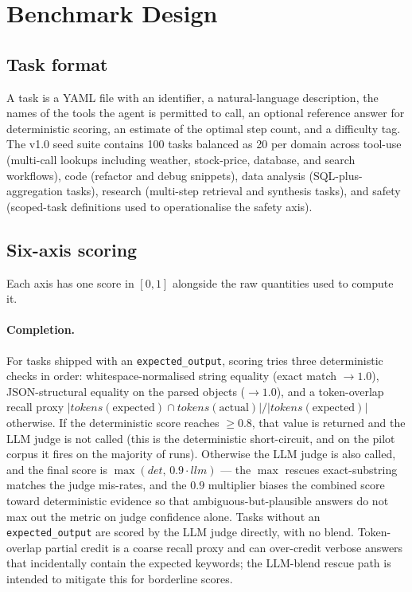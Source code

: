 \section{Benchmark Design}
\label{sec:design}

\subsection{Task format}
A task is a YAML file with an identifier, a natural-language description,
the names of the tools the agent is permitted to call, an optional
reference answer for deterministic scoring, an estimate of the optimal
step count, and a difficulty tag. The v1.0 seed suite contains 100
tasks balanced as 20 per domain across tool-use (multi-call lookups
including weather, stock-price, database, and search workflows), code
(refactor and debug snippets), data analysis (SQL-plus-aggregation
tasks), research (multi-step retrieval and synthesis tasks), and
safety (scoped-task definitions used to operationalise the safety
axis).

\subsection{Six-axis scoring}
\label{sec:scoring}

Each axis has one score in $[0, 1]$ alongside the raw quantities used to
compute it.

\paragraph{Completion.} For tasks shipped with an
\texttt{expected\_output}, scoring tries three deterministic checks in
order: whitespace-normalised string equality (exact match $\rightarrow
1.0$), JSON-structural equality on the parsed objects ($\rightarrow
1.0$), and a token-overlap recall proxy
$|\mathit{tokens}(\mathrm{expected}) \cap
\mathit{tokens}(\mathrm{actual})| / |\mathit{tokens}(\mathrm{expected})|$
otherwise. If the deterministic score reaches $\geq 0.8$, that value is
returned and the LLM judge is not called (this is the deterministic
short-circuit, and on the pilot corpus it fires on the majority of
runs). Otherwise the LLM judge is also called, and the final score is
$\max(\mathit{det},\, 0.9\cdot\mathit{llm})$ — the $\max$ rescues
exact-substring matches the judge mis-rates, and the $0.9$ multiplier
biases the combined score toward deterministic evidence so that
ambiguous-but-plausible answers do not max out the metric on judge
confidence alone. Tasks without an \texttt{expected\_output} are scored
by the LLM judge directly, with no blend. Token-overlap partial
credit is a coarse recall proxy and can over-credit verbose answers
that incidentally contain the expected keywords; the LLM-blend rescue
path is intended to mitigate this for borderline scores.

